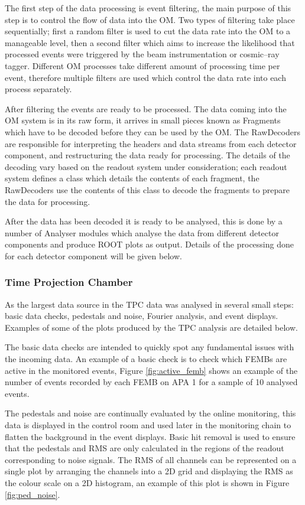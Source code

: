 The first step of the data processing is event filtering, the main purpose of
this step is to control the flow of data into the OM. Two types of filtering
take place sequentially; first a random filter is used to cut the data rate into
the OM to a manageable level, then a second filter which aims to increase the 
likelihood that processed events were triggered by the beam instrumentation or 
cosmic--ray tagger. Different OM processes take different amount of
processing time per event, therefore multiple filters are used which control the
data rate into each process separately.

After filtering the events are ready to be processed. The data coming into the
OM system is in its raw form, it arrives in small pieces known as Fragments
which have to be decoded before they can be used by the OM. The RawDecoders 
are responsible for interpreting the headers and data streams from each 
detector component, and restructuring the data ready for processing. The 
details of the decoding vary based on the readout system under consideration; 
each readout system defines a class which details the contents of each
fragment, the RawDecoders use the contents of this class to decode the fragments
to prepare the data for processing.

After the data has been decoded it is ready to be analysed, this is done by a
number of Analyser modules which analyse the data from different detector
components and produce ROOT \cite{ANTCHEVA20092499} plots as output. Details 
of the processing done for each detector component will be given below.

\subsubsection*{Time Projection Chamber}
As the largest data source in \protodune{} the TPC data was analysed in several
small steps: basic data checks, pedestals and noise, Fourier analysis, and event
displays. Examples of some of the plots produced by the TPC analysis are
detailed below.

The basic data checks are intended to quickly spot any fundamental issues with
the incoming data. An example of a basic check is to check which FEMBs are
active in the monitored events, Figure \ref{fig:active_femb} shows an example of
the number of events recorded by each FEMB on APA 1 for a sample of 10 analysed
events.

The pedestals and noise are continually evaluated by the online monitoring, this
data is displayed in the control room and used later in the monitoring chain to
flatten the background in the event displays. Basic hit removal is used to 
ensure that the pedestals and RMS are only calculated in the regions of the 
readout corresponding to noise signals. The RMS of all channels can be
represented on a single plot by arranging the channels into a 2D grid and
displaying the RMS as the colour scale on a 2D histogram, an example of this
plot is shown in Figure \ref{fig:ped_noise}.

